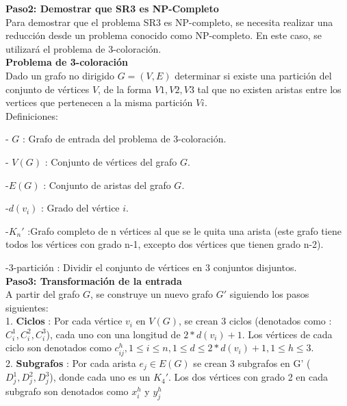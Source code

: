 \documentclass[
10pt, %
a4paper, %
oneside, %
headinclude,footinclude, %
BCOR5mm, %
]{scrartcl}
\begin{document}
\textbf{Paso2: Demostrar que SR3 es NP-Completo}\\

Para demostrar que el problema SR3 es NP-completo, se necesita realizar una reducción desde un problema conocido como NP-completo. 
En este caso, se utilizará el problema de 3-coloración.\\


\textbf{ Problema de 3-coloración} \\


Dado un grafo no dirigido $G = (V,E)$ determinar si existe una partición del conjunto de vértices $V$,
de la forma ${V1,V2,V3}$ tal que no existen aristas entre los vertices que pertenecen a la misma partición $Vi$.\\


Definiciones:

- $G$ : Grafo de entrada del problema de 3-coloración.

- $V(G)$ : Conjunto de vértices del grafo $G$.

-$E(G)$ : Conjunto de aristas del grafo $G$. 

-$d(v_i)$ : Grado del vértice $i$.

-$K_n'$ :Grafo completo de n vértices al que se le quita una arista (este grafo tiene todos los vértices con grado n-1, excepto dos vértices que tienen grado n-2).

-3-partición : Dividir el conjunto de vértices en 3 conjuntos disjuntos.\\



\textbf{Paso3: Transformación de la entrada  }\\

A partir del grafo $G$, se construye un nuevo grafo $G'$ siguiendo los pasos siguientes:\\

1. \textbf{Ciclos} : Por cada vértice $v_i$ en $V(G)$, se crean 3 ciclos (denotados como : $C^1_i, C^2_i, C^3_i$), 
cada uno con una longitud de $2*d(v_i) + 1$. Los vértices de cada ciclo son denotados como $c_{ij}^{h} , 1 \leq i \leq n , 1 \leq d \leq 2*d(v_i) + 1 , 1 \leq h \leq 3 $.\\

2. \textbf{Subgrafos} : Por cada arista $e_j \in E(G)$ se crean 3 subgrafos en G' ($D^1_j, D^2_j, D^3_j$), donde cada uno es un $K_4'$. Los dos vértices con grado 2 en cada 
subgrafo son denotados como $x^h_i$ y $y^h_j$\\
\end{document}
